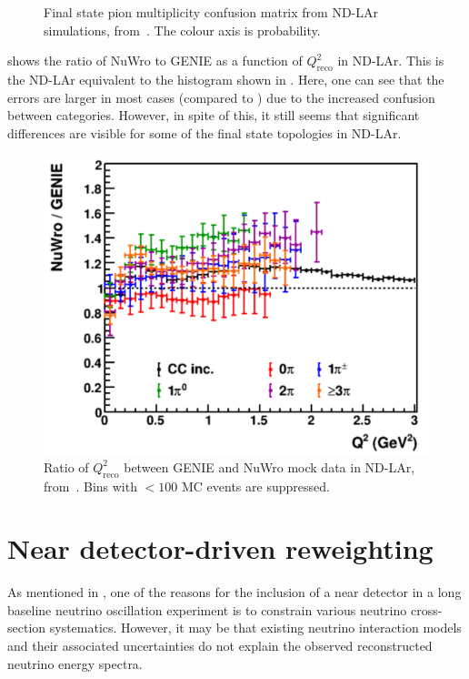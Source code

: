 \begin{figure}[h]
	\begin{adjustbox}{max totalsize=.6\linewidth, center}
		
	\end{adjustbox}
	\caption[Final state pion multiplicity confusion matrix from ND-LAr simulations]{Final state pion multiplicity confusion matrix from ND-LAr simulations, from~\cite{ndCdr}. The colour axis is probability.}
	\label{fig:larConfusMat}
\end{figure}

 shows the ratio of NuWro to GENIE as a function of $Q^{2}_{\textrm{reco}}$ in ND-LAr.
This is the ND-LAr equivalent to the histogram shown in . 
Here, one can see that the errors are larger in most cases (compared to ) due to the increased confusion between categories.
However, in spite of this, it still seems that significant differences are visible for some of the final state topologies in ND-LAr.

\begin{figure}[h]
	\centering
	\includegraphics[width=.6\linewidth]{files/figures/dune_ndrwt/larQ2Reco}
	\caption[Ratio of $Q^{2}_{\textrm{reco}}$ between GENIE and NuWro mock data in ND-LAr]{Ratio of $Q^{2}_{\textrm{reco}}$ between GENIE and NuWro mock data in ND-LAr, from~\cite{ndCdr}. Bins with $<100$ MC events are suppressed.}
	\label{fig:q2LarFhc}	
\end{figure}

\section{Near detector-driven reweighting}
\label{sec:dune_ndrwt:rwt}

As mentioned in , one of the reasons for the inclusion of a near detector in a long baseline neutrino oscillation experiment is to constrain various neutrino cross-section systematics.
However, it may be that existing neutrino interaction models and their associated uncertainties do not explain the observed reconstructed neutrino energy spectra.

